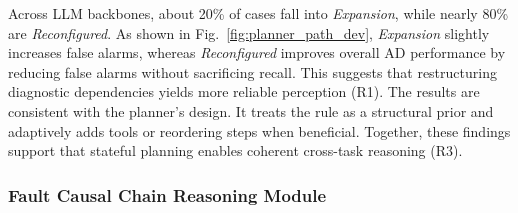\documentclass[sigconf,10pt]{acmart} %
\begin{document}
Across LLM backbones, about 20\% of cases fall into \textit{Expansion}, while nearly 80\% are \textit{Reconfigured}. As shown in Fig.~\ref{fig:planner_path_dev}, \textit{Expansion} slightly increases false alarms, whereas \textit{Reconfigured} improves overall AD performance by reducing false alarms without sacrificing recall. This suggests that restructuring diagnostic dependencies yields more reliable perception (R1). The results are consistent with the planner’s design. It treats the rule as a structural prior and adaptively adds tools or reordering steps when beneficial. Together, these findings support that stateful planning enables coherent cross-task reasoning (R3).


\subsubsection{Fault Causal Chain Reasoning Module}
\label{exp:FCR module}


\begin{table}
\centering
  \caption{Stage-wise ranking of the ground-truth chain among FCR candidate chains with GPT-5.2 as the verifier backbone. MRR and Top-5 AUC characterize the concentration of the ranking toward the ground-truth chain, while R@1/3/5 measure its cumulative recall under different cutoffs.}
\label{tab:fcr_stage_analysis}
\end{table}
\end{document}
